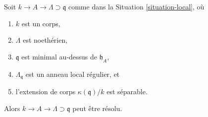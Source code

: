 \begin{lemma}
\label{lemma-resolve-special}
Soit $k \to A \to \Lambda \supset \mathfrak q$ comme dans la
Situation \ref{situation-local}, où
\begin{enumerate}
\item $k$ est un corps,
\item $\Lambda$ est noethérien,
\item $\mathfrak q$ est minimal au-dessus de $\mathfrak h_A$,
\item $\Lambda_\mathfrak q$ est un anneau local régulier, et
\item l'extension de corps $\kappa(\mathfrak q)/k$ est séparable.
\end{enumerate}
Alors $k \to A \to \Lambda \supset \mathfrak q$ peut être résolu.
\end{lemma}

